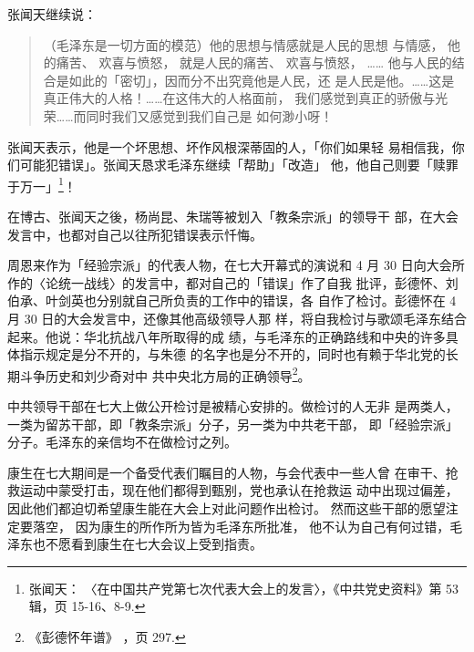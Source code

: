 张闻天继续说：
\begin{quote}
	\fzwkai （毛泽东是一切方面的模范）他的思想与情感就是人民的思想
与情感，
他的痛苦、
欢喜与愤怒，
就是人民的痛苦、
欢喜与愤怒，
……
他与人民的结合是如此的「密切」，因而分不出究竟他是人民，还
是人民是他。……这是真正伟大的人格！……在这伟大的人格面前，
我们感觉到真正的骄傲与光荣……而同时我们又感觉到我们自己是
如何渺小呀！
\end{quote}

张闻天表示，他是一个坏思想、坏作风根深蒂固的人，「你们如果轻
易相信我，你们可能犯错误」。张闻天恳求毛泽东继续「帮助」「改造」
他，他自己则要「赎罪于万一」\footnote{张闻天：
〈在中国共产党第七次代表大会上的发言〉，《中共党史资料》第 53 辑，页 15-16、8-9.}！

在博古、张闻天之後，杨尚昆、朱瑞等被划入「教条宗派」的领导干
部，在大会发言中，也都对自己以往所犯错误表示忏悔。

周恩来作为「经验宗派」的代表人物，在七大开幕式的演说和 4 月 30
日向大会所作的〈论统一战线〉的发言中，都对自己的「错误」作了自我
批评，彭德怀、刘伯承、叶剑英也分别就自己所负责的工作中的错误，各
自作了检讨。彭德怀在 4 月 30 日的大会发言中，还像其他高级领导人那
样，将自我检讨与歌颂毛泽东结合起来。他说：华北抗战八年所取得的成
绩，与毛泽东的正确路线和中央的许多具体指示规定是分不开的，与朱德
的名字也是分不开的，同时也有赖于华北党的长期斗争历史和刘少奇对中
共中央北方局的正确领导\footnote{《彭德怀年谱》
，页 297.}。

中共领导干部在七大上做公开检讨是被精心安排的。做检讨的人无非
是两类人，一类为留苏干部，即「教条宗派」分子，另一类为中共老干部，
即「经验宗派」分子。毛泽东的亲信均不在做检讨之列。

康生在七大期间是一个备受代表们瞩目的人物，与会代表中一些人曾
在审干、抢救运动中蒙受打击，现在他们都得到甄别，党也承认在抢救运
动中出现过偏差，
因此他们都迫切希望康生能在大会上对此问题作出检讨。
然而这些干部的愿望注定要落空，
因为康生的所作所为皆为毛泽东所批准，
他不认为自己有何过错，毛泽东也不愿看到康生在七大会议上受到指责。

